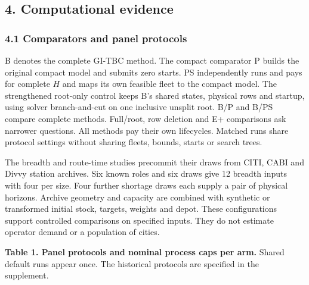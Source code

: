 \documentclass[
  american,
  11pt,
]{article}
\begin{document}
\subsection{4. Computational evidence}\label{computational-evidence}

\subsubsection{4.1 Comparators and panel
protocols}\label{comparators-and-panel-protocols}

B denotes the complete GI-TBC method. The compact comparator P builds
the original compact model and submits zero starts. PS independently
runs and pays for complete \(H\) and maps its own feasible fleet to the
compact model. The strengthened root-only control keeps B's shared
states, physical rows and startup, using solver branch-and-cut on one
inclusive unsplit root. B/P and B/PS compare complete methods.
Full/root, row deletion and E+ comparisons ask narrower questions. All
methods pay their own lifecycles. Matched runs share protocol settings
without sharing fleets, bounds, starts or search trees.

The breadth and route-time studies precommit their draws from CITI, CABI
and Divvy station archives. Six known roles and six draws give 12
breadth inputs with four per size. Four further shortage draws each
supply a pair of physical horizons. Archive geometry and capacity are
combined with synthetic or transformed initial stock, targets, weights
and depot. These configurations support controlled comparisons on
specified inputs. They do not estimate operator demand or a population
of cities.


\textbf{Table 1. Panel protocols and nominal process caps per arm.}
Shared default runs appear once. The historical protocols are specified
in the supplement.
\end{document}
